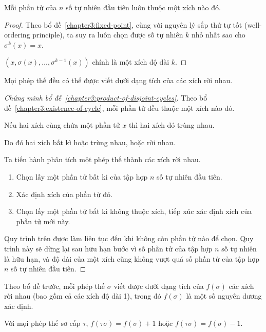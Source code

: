 \begin{lemma}\label{chapter3:existence-of-cycle}
    Mỗi phần tử của $n$ số tự nhiên đầu tiên luôn thuộc một xích nào đó.
\end{lemma}

\begin{proof}
    Theo bổ đề~\ref{chapter3:fixed-point}, cùng với nguyên lý sắp thứ tự tốt (well-ordering principle), ta suy ra luôn chọn được số tự nhiên $k$ nhỏ nhất sao cho $\sigma^{k}(x) = x$.
    
    $(x, \sigma(x), \ldots, \sigma^{k-1}(x))$ chính là một xích độ dài $k$.
\end{proof}

\begin{lemma}\label{chapter3:product-of-disjoint-cycles}
    Mọi phép thế đều có thể được viết dưới dạng tích của các xích rời nhau.
\end{lemma}

\begin{proof}[Chứng minh bổ đề~\ref{chapter3:product-of-disjoint-cycles}]
    Theo bổ đề~\ref{chapter3:existence-of-cycle}, mỗi phần tử đều thuộc một xích nào đó.
    
    Nếu hai xích cùng chứa một phần tử $x$ thì hai xích đó trùng nhau.
    
    Do đó hai xích bất kì hoặc trùng nhau, hoặc rời nhau.
    
    Ta tiến hành phân tích một phép thế thành các xích rời nhau.
    \begin{enumerate}[label = (\arabic*)]
        \item Chọn lấy một phần tử bất kì của tập hợp $n$ số tự nhiên đầu tiên.
        \item Xác định xích của phần tử đó.
        \item Chọn lấy một phần tử bất kì không thuộc xích, tiếp xúc xác định xích của phần tử mới này.
    \end{enumerate}
    
    Quy trình trên được làm liên tục đến khi không còn phần tử nào để chọn. Quy trình này sẽ dừng lại sau hữu hạn bước vì số phần tử của tập hợp $n$ số tự nhiên là hữu hạn, và độ dài của một xích cũng không vượt quá số phần tử của tập hợp $n$ số tự nhiên đầu tiên.
\end{proof}

\begin{lemma}\label{chapter3:cycles-and-transposition}
    Theo bổ đề trước, mỗi phép thế $\sigma$ viết được dưới dạng tích của $f(\sigma)$ các xích rời nhau (bao gồm cả các xích độ dài 1), trong đó $f(\sigma)$ là một số nguyên dương xác định.

    Với mọi phép thế sơ cấp $\tau$, $f(\tau\sigma) = f(\sigma) + 1$ hoặc $f(\tau\sigma) = f(\sigma) - 1$.
\end{lemma}

